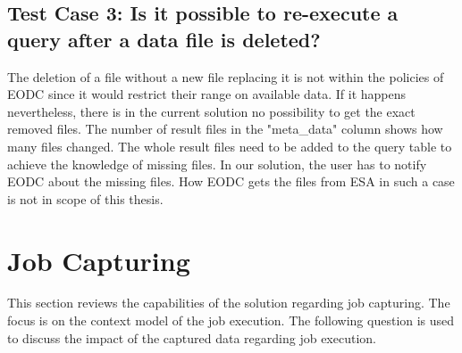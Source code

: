 \documentclass[draft,final]{vutinfth} %
\begin{document}
\subsection{Test Case 3: Is it possible to re-execute a query after a data file is deleted?}
The deletion of a file without a new file replacing it is not within the policies of EODC since it would restrict their range on available data. If it happens nevertheless, there is in the current solution no possibility to get the exact removed files. The number of result files in the "meta\_data" column shows how many files changed. The whole result files need to be added to the query table to achieve the knowledge of missing files. In our solution, the user has to notify EODC about the missing files. How EODC gets the files from ESA in such a case is not in scope of this thesis.



\newpage
\section{Job Capturing}\label{Evaluation:special_jobcap}

This section reviews the capabilities of the solution regarding job capturing. The focus is on the context model of the job execution. The following question is used to discuss the impact of the captured data regarding job execution. \\
\end{document}
